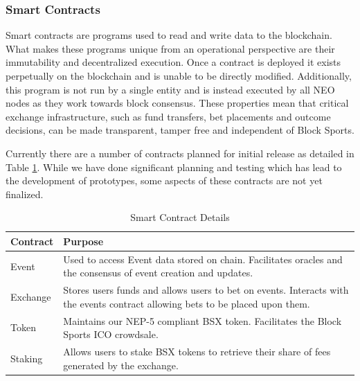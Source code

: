 \documentclass{article}
\begin{document}
		\subsubsection{Smart Contracts}
Smart contracts are programs used to read and write data to the blockchain. What makes these programs unique from an operational perspective are their immutability and decentralized execution. Once a contract is deployed it exists perpetually on the blockchain and is unable to be directly modified. Additionally, this program is not run by a single entity and is instead executed by all NEO nodes as they work towards block consensus. These properties mean that critical exchange infrastructure, such as fund transfers, bet placements and outcome decisions, can be made transparent, tamper free and independent of Block Sports.

Currently there are a number of contracts planned for initial release as detailed in Table \ref{table:contracts}. While we have done significant planning and testing which has lead to the development of prototypes, some aspects of these contracts are not yet finalized.

\begin{table}[!htb]
\caption{Smart Contract Details}

\begin{tabularx}{\textwidth}{ p{3cm}  p{8.4cm}}
\bfseries{Contract} & \bfseries{Purpose} \\
\hline

Event & Used to access Event data stored on chain. \newline Facilitates oracles and the consensus of event creation and updates. \\   \hline

Exchange & Stores users funds and allows users to bet on events. \newline Interacts with the events contract allowing bets to be placed upon them. \\   \hline

Token & Maintains our NEP-5 compliant BSX token. \newline Facilitates the Block Sports ICO crowdsale. \\   \hline

Staking & Allows users to stake BSX tokens to retrieve \newline their share of fees generated by the exchange. \\

\hline

\end{tabularx}
\label{table:contracts}
\end{table}
\end{document}
